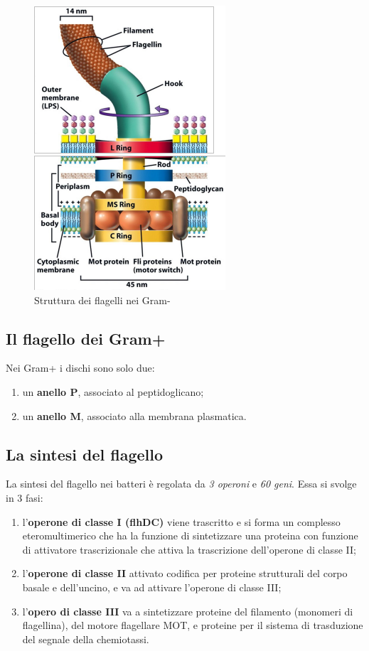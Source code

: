 \documentclass[11pt]{book}
\begin{document}
\clearpage

\begin{figure}[htp]
\centering
\includegraphics[scale=0.66]{img/Flagello.png}
\caption{Struttura dei flagelli nei Gram-}
\label{flagelli_gram-}
\end{figure}

\subsection{Il flagello dei Gram+}

Nei Gram+ i dischi sono solo due:
\begin{enumerate}
\item un \textbf{anello P}, associato al peptidoglicano;
\item un \textbf{anello M}, associato alla membrana plasmatica.
\end{enumerate}

\subsection{La sintesi del flagello}

La sintesi del flagello nei batteri è regolata da \emph{3 operoni} e \emph{60 geni}.
Essa si svolge in 3 fasi:
\begin{enumerate}
\item l’\textbf{operone di classe I (flhDC)} viene trascritto e si forma un complesso eteromultimerico che ha la funzione di sintetizzare una proteina con funzione di attivatore trascrizionale che attiva la trascrizione dell’operone di classe II;
\item l’\textbf{operone di classe II} attivato codifica per proteine strutturali del corpo basale e dell’uncino, e va ad attivare l’operone di classe III;
\item l’\textbf{opero di classe III} va a sintetizzare proteine del filamento (monomeri di flagellina), del motore flagellare MOT, e proteine per il sistema di trasduzione del segnale della chemiotassi.
\end{enumerate}
\end{document}
